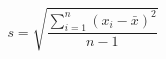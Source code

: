 \documentclass[12pt]{article}
\begin{document}
  \begin{displaymath}
    s = \sqrt{ \frac{ \sum\limits_{i=1}^n (x_i - \bar{x})^2 } {n-1} }
  \end{displaymath}
\end{document}
